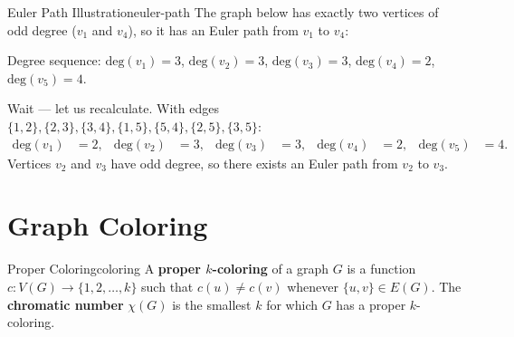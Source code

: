 \documentclass[11pt,a4paper]{scrartcl}
\renewcommand{\deg}{\mathrm{deg}}        %
\begin{document}
\begin{example}{Euler Path Illustration}{euler-path}
The graph below has exactly two vertices of odd degree ($v_1$ and $v_4$), so it has an Euler path from $v_1$ to $v_4$:

\begin{center}
\end{center}

\noindent Degree sequence: $\deg(v_1) = 3$, $\deg(v_2) = 3$, $\deg(v_3) = 3$, $\deg(v_4) = 2$, $\deg(v_5) = 4$.

Wait --- let us recalculate. With edges $\{1,2\}, \{2,3\}, \{3,4\}, \{1,5\}, \{5,4\}, \{2,5\}, \{3,5\}$:
\begin{align*}
  \deg(v_1) &= 2, & \deg(v_2) &= 3, & \deg(v_3) &= 3, & \deg(v_4) &= 2, & \deg(v_5) &= 4.
\end{align*}
Vertices $v_2$ and $v_3$ have odd degree, so there exists an Euler path from $v_2$ to $v_3$.
\end{example}


\section{Graph Coloring}

\begin{definition}{Proper Coloring}{coloring}
A \textbf{proper $k$-coloring} of a graph $G$ is a function $c : V(G) \to \{1, 2, \ldots, k\}$ such that $c(u) \neq c(v)$ whenever $\{u, v\} \in E(G)$. The \textbf{chromatic number} $\chi(G)$ is the smallest $k$ for which $G$ has a proper $k$-coloring.
\end{definition}
\end{document}
